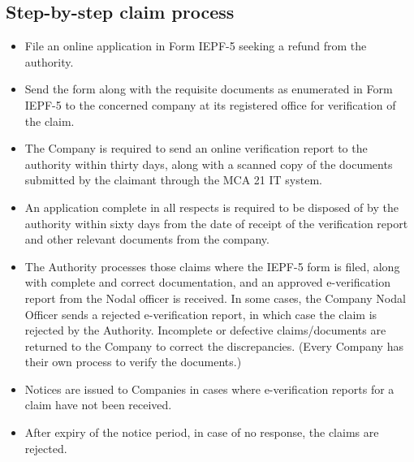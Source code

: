 \documentclass[openany]{book}
\begin{document}
\subsection{Step-by-step claim process}
\begin{itemize}
    \item File an online application in Form IEPF-5 seeking a refund from the authority.
    \item Send the form along with the requisite documents as enumerated in Form IEPF-5 to the concerned company at its registered office for verification of the claim.
    \item The Company is required to send an online verification report to the authority within thirty days, along with a scanned copy of the documents submitted by the claimant through the MCA 21 IT system.
    \item An application complete in all respects is required to be disposed of by the authority within sixty days from the date of receipt of the verification report and other relevant documents from the company.
    \item The Authority processes those claims where the IEPF-5 form is filed, along with complete and correct documentation, and an approved e-verification report from the Nodal officer is received. In some cases, the Company Nodal Officer sends a rejected e-verification report, in which case the claim is rejected by the Authority. Incomplete or defective claims/documents are returned to the Company to correct the discrepancies. (Every Company has their own process to verify the documents.)
    \item Notices are issued to Companies in cases where e-verification reports for a claim have not been received.
    \item After expiry of the notice period, in case of no response, the claims are rejected.
\end{itemize}
\end{document}
